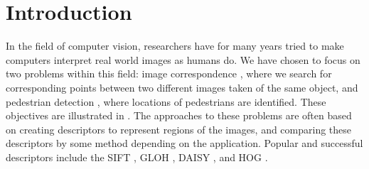 \documentclass[thesis.tex]{subfiles}
\begin{document}
\section{Introduction}
\label{sec:introduction}

In the field of computer vision, researchers have for many years tried to make computers interpret real world images as humans do. We have chosen to focus on two problems within this field: image correspondence \cite{dahl2011finding}, where we search for corresponding points between two different images taken of the same object, and pedestrian detection \cite{felzenszwalb2008discriminatively}, where locations of pedestrians are identified. These objectives are illustrated in . The approaches to these problems are often based on creating descriptors to represent regions of the images, and comparing these descriptors by some method depending on the application. Popular and successful descriptors include the SIFT \cite{lowe2004distinctive}, GLOH \cite{mikolajczyk2005performance}, DAISY \cite{tola2008fast}, and HOG \cite{dalal2005histograms,felzenszwalb2009object}. 
%
\end{document}
